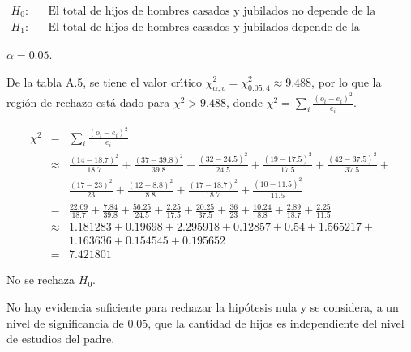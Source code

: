 \begin{solucion}
 \begin{hipotesis}
  \begin{eqnarray*}
   H_0: & & \text{El total de hijos de hombres casados y jubilados no depende de la educaci\'on.} \\
   H_1: & & \text{El total de hijos de hombres casados y jubilados depende de la educaci\'on.}
  \end{eqnarray*}
 \end{hipotesis}

 \begin{significancia}
  $\alpha = 0.05$.
 \end{significancia}

 \begin{region}
  De la tabla A.5, se tiene el valor cr\'{\i}tico
  $\chi^2_{\alpha,v} = \chi^2_{0.05,4} \approx 9.488$,
  por lo que la regi\'on de rechazo est\'a dado
  para $\chi^2 > 9.488$, donde
  $\chi^2 = \sum_{i} \frac{\left( o_i - e_i \right)^2}{e_i}$.
 \end{region}

 \begin{estadistico}
  \begin{eqnarray*}
   \chi^2 & = & \sum_{i} \frac{\left( o_i - e_i \right)^2}{e_i} \\
   & \approx & \frac{(14 - 18.7)^2}{18.7} + \frac{(37 - 39.8)^2}{39.8} +
   \frac{(32 - 24.5)^2}{24.5} + \frac{(19 - 17.5)^2}{17.5} +
   \frac{(42 - 37.5)^2}{37.5} + \\
   & & \frac{(17 - 23)^2}{23} + \frac{(12 - 8.8)^2}{8.8} +
   \frac{(17 - 18.7)^2}{18.7} + \frac{(10 - 11.5)^2}{11.5} \\
   & = & \frac{22.09}{18.7} + \frac{7.84}{39.8} + \frac{56.25}{24.5} +
   \frac{2.25}{17.5} + \frac{20.25}{37.5} + \frac{36}{23} +
   \frac{10.24}{8.8} + \frac{2.89}{18.7} + \frac{2.25}{11.5} \\
   & \approx & 1.181283 + 0.19698 + 2.295918 + 0.12857 + 0.54 + 1.565217 + \\
   & & 1.163636 + 0.154545 + 0.195652 \\
   & = & 7.421801
  \end{eqnarray*}
 \end{estadistico}

 \begin{decision}
  No se rechaza $H_0$.
 \end{decision}

 \begin{conclusion}
  No hay evidencia suficiente para rechazar la hip\'otesis nula 
  y se considera, a un nivel de significancia de $0.05$,
  que la cantidad de hijos es independiente del nivel de estudios del padre.
 \end{conclusion}


\end{solucion}

